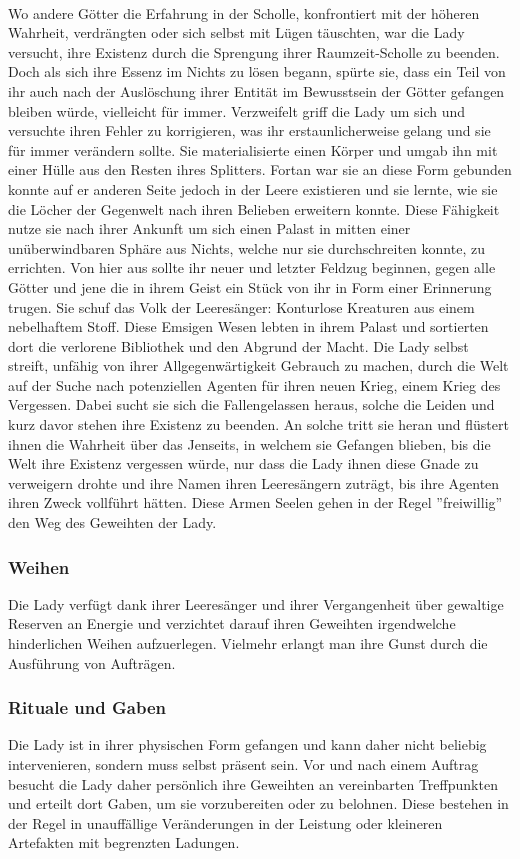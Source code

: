 \documentclass[a4paper,12pt,oneside]{book}
\begin{document}
\\Wo andere Götter die Erfahrung in der Scholle, konfrontiert mit der höheren Wahrheit, verdrängten oder sich selbst mit Lügen täuschten, war die Lady versucht, ihre Existenz durch die Sprengung ihrer Raumzeit-Scholle zu beenden. Doch als sich ihre Essenz im Nichts zu lösen begann, spürte sie, dass ein Teil von ihr auch nach der Auslöschung ihrer Entität im Bewusstsein der Götter gefangen bleiben würde, vielleicht für immer. Verzweifelt griff die Lady um sich und versuchte ihren Fehler zu korrigieren, was ihr erstaunlicherweise gelang und sie für immer verändern sollte. Sie materialisierte einen Körper und umgab ihn mit einer Hülle aus den Resten ihres Splitters. Fortan war sie an diese Form gebunden konnte auf er anderen Seite jedoch in der Leere existieren und sie lernte, wie sie die Löcher der Gegenwelt nach ihren Belieben erweitern konnte. Diese Fähigkeit nutze sie nach ihrer Ankunft um sich einen Palast in mitten einer unüberwindbaren Sphäre aus Nichts, welche nur sie durchschreiten konnte, zu errichten. Von hier aus sollte ihr neuer und letzter Feldzug beginnen, gegen alle Götter und jene die in ihrem Geist ein Stück von ihr in Form einer Erinnerung trugen. Sie schuf das Volk der Leeresänger: Konturlose Kreaturen aus einem nebelhaftem Stoff. Diese Emsigen Wesen lebten in ihrem Palast und sortierten dort die verlorene Bibliothek und den Abgrund der Macht. Die Lady selbst streift, unfähig von ihrer Allgegenwärtigkeit Gebrauch zu machen, durch die Welt auf der Suche nach potenziellen Agenten für ihren neuen Krieg, einem Krieg des Vergessen. Dabei sucht sie sich die Fallengelassen heraus, solche die Leiden und kurz davor stehen ihre Existenz zu beenden. An solche tritt sie heran und flüstert ihnen die Wahrheit über das Jenseits, in welchem sie Gefangen blieben, bis die Welt ihre Existenz vergessen würde, nur dass die Lady ihnen diese Gnade zu verweigern drohte und ihre Namen ihren Leeresängern zuträgt, bis ihre Agenten ihren Zweck vollführt hätten. Diese Armen Seelen gehen in der Regel ''freiwillig'' den Weg des Geweihten der Lady.
\subsubsection{Weihen}
Die Lady verfügt dank ihrer Leeresänger und ihrer Vergangenheit über gewaltige Reserven an Energie und verzichtet darauf ihren Geweihten irgendwelche hinderlichen Weihen aufzuerlegen. Vielmehr erlangt man ihre Gunst durch die Ausführung von Aufträgen.
\subsubsection{Rituale und Gaben}
Die Lady ist in ihrer physischen Form gefangen und kann daher nicht beliebig intervenieren, sondern muss selbst präsent sein. Vor und nach einem Auftrag besucht die Lady daher persönlich ihre Geweihten an vereinbarten Treffpunkten und erteilt dort Gaben, um sie vorzubereiten oder zu belohnen. Diese bestehen in der Regel in unauffällige Veränderungen in der Leistung oder kleineren Artefakten mit begrenzten Ladungen. 
\end{document}
